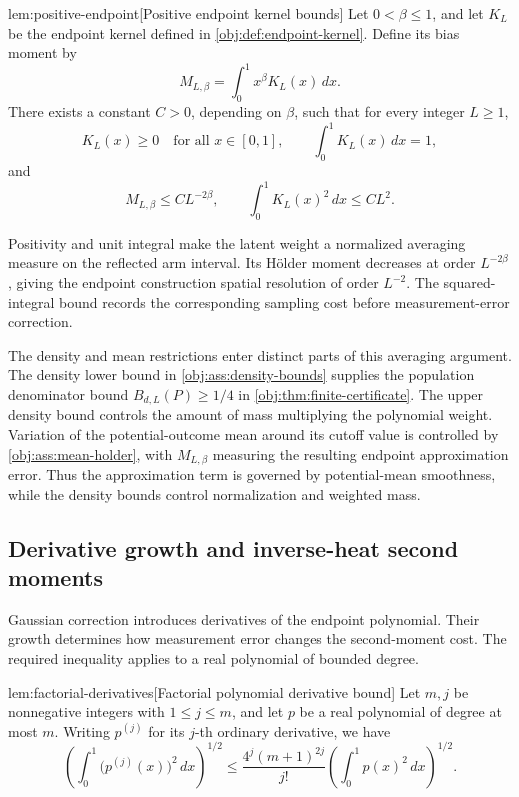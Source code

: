 \begin{lemmav}{lem:positive-endpoint}[Positive endpoint kernel bounds]
Let \(0<\beta\le1\), and let \(K_L\) be the endpoint kernel defined in \cref{obj:def:endpoint-kernel}. Define its bias moment by
\[
M_{L,\beta}=\int_0^1 x^\beta K_L(x)\,dx.
\]
There exists a constant \(C>0\), depending on \(\beta\), such that for every integer \(L\ge1\),
\[
K_L(x)\ge0\quad\text{for all }x\in[0,1],
\qquad
\int_0^1 K_L(x)\,dx=1,
\]
and
\[
M_{L,\beta}\le C L^{-2\beta},
\qquad
\int_0^1 K_L(x)^2\,dx\le C L^2.
\]
\end{lemmav}

Positivity and unit integral make the latent weight a normalized averaging measure on the reflected arm interval. Its Hölder moment decreases at order \(L^{-2\beta}\), giving the endpoint construction spatial resolution of order \(L^{-2}\). The squared-integral bound records the corresponding sampling cost before measurement-error correction.

The density and mean restrictions enter distinct parts of this averaging argument. The density lower bound in \cref{obj:ass:density-bounds} supplies the population denominator bound \(B_{d,L}(P)\ge1/4\) in \cref{obj:thm:finite-certificate}. The upper density bound controls the amount of mass multiplying the polynomial weight. Variation of the potential-outcome mean around its cutoff value is controlled by \cref{obj:ass:mean-holder}, with \(M_{L,\beta}\) measuring the resulting endpoint approximation error. Thus the approximation term is governed by potential-mean smoothness, while the density bounds control normalization and weighted mass.

\subsection{Derivative growth and inverse-heat second moments}

Gaussian correction introduces derivatives of the endpoint polynomial. Their growth determines how measurement error changes the second-moment cost. The required inequality applies to a real polynomial  of bounded degree.

\begin{lemmav}{lem:factorial-derivatives}[Factorial polynomial derivative bound]
Let \(m,j\) be nonnegative integers with \(1\le j\le m\), and let \(p\) be a real polynomial of degree at most \(m\). Writing \(p^{(j)}\) for its \(j\)-th ordinary derivative, we have
\[
\left(\int_0^1 \bigl(p^{(j)}(x)\bigr)^2\,dx\right)^{1/2}
\le
\frac{4^j(m+1)^{2j}}{j!}
\left(\int_0^1 p(x)^2\,dx\right)^{1/2}.
\]
\end{lemmav}

